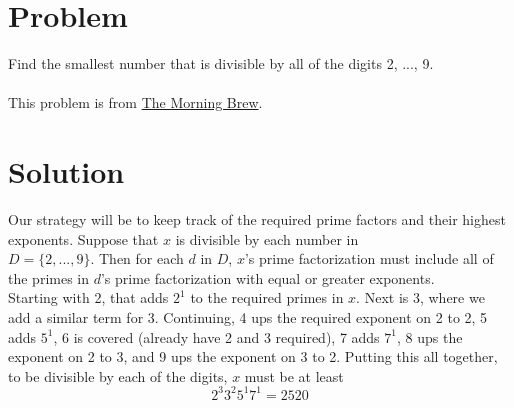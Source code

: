 \documentclass[11pt,a4paper]{report}
\theoremstyle{plain}
\theoremstyle{definition}
\theoremstyle{remark}
\begin{document}
\section*{Problem}
Find the smallest number that is divisible by all of the digits 2, ..., 9.
\\\\
This problem is from \href{https://www.morningbrew.com} {The Morning Brew}.

\section*{Solution} Our strategy will be to keep track of the required
prime factors and their highest exponents.  Suppose that $x$ is divisible by
each number in \\ $D = \{2, ..., 9\}.$  Then for each $d$ in $D$, $x$'s prime
factorization must include all of the primes in $d$'s prime factorization with
equal or greater exponents.  \\ Starting with 2, that adds $2^1$ to the required
primes in $x$.  Next is 3, where we add a similar term for 3.  Continuing, 4 ups
the required exponent on 2 to 2, 5 adds $5^1$, 6 is covered (already have 2 and
3 required), 7 adds $7^1$, 8 ups the exponent on 2 to 3,  and 9 ups the exponent
on 3 to 2.  Putting this all together, to be divisible by each of the digits,
$x$ must be at least $$ 2^{3}3^{2}5^{1}7^{1} = 2520 $$
\end{document}
